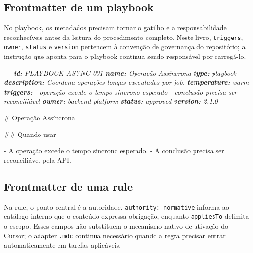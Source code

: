 \documentclass[
  10pt,
  a4paper,
  oneside]{book}
\newenvironment{Shaded}{}{}
\newcommand{\AnnotationTok}[1]{\textcolor[rgb]{0.38,0.63,0.69}{\textbf{\textit{#1}}}}
\newcommand{\CommentTok}[1]{\textcolor[rgb]{0.38,0.63,0.69}{\textit{#1}}}
\newcommand{\FunctionTok}[1]{\textcolor[rgb]{0.02,0.16,0.49}{#1}}
\newcommand{\NormalTok}[1]{#1}
\newcommand{\SpecialStringTok}[1]{\textcolor[rgb]{0.73,0.40,0.53}{#1}}
\begin{document}
\hypertarget{frontmatter-de-um-playbook}{%
\subsection{Frontmatter de um
playbook}\label{frontmatter-de-um-playbook}}

No playbook, os metadados precisam tornar o gatilho e a responsabilidade
reconhecíveis antes da leitura do procedimento completo. Neste livro,
\texttt{triggers}, \texttt{owner}, \texttt{status} e \texttt{version}
pertencem à convenção de governança do repositório; a instrução que
aponta para o playbook continua sendo responsável por carregá-lo.

\begin{Shaded}
\begin{Highlighting}[]
\CommentTok{{-}{-}{-}}
\AnnotationTok{id:}\CommentTok{ PLAYBOOK{-}ASYNC{-}001}
\AnnotationTok{name:}\CommentTok{ Operação Assíncrona}
\AnnotationTok{type:}\CommentTok{ playbook}
\AnnotationTok{description:}\CommentTok{ Coordena operações longas executadas por job.}
\AnnotationTok{temperature:}\CommentTok{ warm}
\AnnotationTok{triggers:}
\CommentTok{  {-} operação excede o tempo síncrono esperado}
\CommentTok{  {-} conclusão precisa ser reconciliável}
\AnnotationTok{owner:}\CommentTok{ backend{-}platform}
\AnnotationTok{status:}\CommentTok{ approved}
\AnnotationTok{version:}\CommentTok{ 2.1.0}
\CommentTok{{-}{-}{-}}

\FunctionTok{\# Operação Assíncrona}

\FunctionTok{\#\# Quando usar}

\SpecialStringTok{{-} }\NormalTok{A operação excede o tempo síncrono esperado.}
\SpecialStringTok{{-} }\NormalTok{A conclusão precisa ser reconciliável pela API.}
\end{Highlighting}
\end{Shaded}

\hypertarget{frontmatter-de-uma-rule}{%
\subsection{Frontmatter de uma rule}\label{frontmatter-de-uma-rule}}

Na rule, o ponto central é a autoridade. \texttt{authority:\ normative}
informa ao catálogo interno que o conteúdo expressa obrigação, enquanto
\texttt{appliesTo} delimita o escopo. Esses campos não substituem o
mecanismo nativo de ativação do Cursor; o adapter \texttt{.mdc} continua
necessário quando a regra precisar entrar automaticamente em tarefas
aplicáveis.
\end{document}
